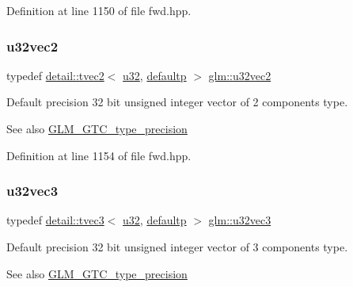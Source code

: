 Definition at line 1150 of file fwd.\+hpp.

\mbox{\label{group__gtc__type__precision_gaa543e17450ca67dee12e2c41badfb3a7}} 
\subsubsection{\texorpdfstring{u32vec2}{u32vec2}}
{\footnotesize\ttfamily typedef \hyperlink{structglm_1_1detail_1_1tvec2}{detail\+::tvec2}$<$ \hyperlink{group__gtc__type__precision_ga54e837745059fd29017bed71cfa0a8db}{u32}, \hyperlink{namespaceglm_a0f04f086094c747d227af4425893f545a9d21ccd8b5a009ec7eb7677befc3bf51}{defaultp} $>$ \hyperlink{group__gtc__type__precision_gaa543e17450ca67dee12e2c41badfb3a7}{glm\+::u32vec2}}

Default precision 32 bit unsigned integer vector of 2 components type. \begin{DoxySeeAlso}{See also}
\hyperlink{group__gtc__type__precision}{G\+L\+M\+\_\+\+G\+T\+C\+\_\+type\+\_\+precision} 
\end{DoxySeeAlso}


Definition at line 1154 of file fwd.\+hpp.

\mbox{\label{group__gtc__type__precision_ga7c88634a005904a441cba739d7cc4055}} 
\subsubsection{\texorpdfstring{u32vec3}{u32vec3}}
{\footnotesize\ttfamily typedef \hyperlink{structglm_1_1detail_1_1tvec3}{detail\+::tvec3}$<$ \hyperlink{group__gtc__type__precision_ga54e837745059fd29017bed71cfa0a8db}{u32}, \hyperlink{namespaceglm_a0f04f086094c747d227af4425893f545a9d21ccd8b5a009ec7eb7677befc3bf51}{defaultp} $>$ \hyperlink{group__gtc__type__precision_ga7c88634a005904a441cba739d7cc4055}{glm\+::u32vec3}}

Default precision 32 bit unsigned integer vector of 3 components type. \begin{DoxySeeAlso}{See also}
\hyperlink{group__gtc__type__precision}{G\+L\+M\+\_\+\+G\+T\+C\+\_\+type\+\_\+precision} 
\end{DoxySeeAlso}


